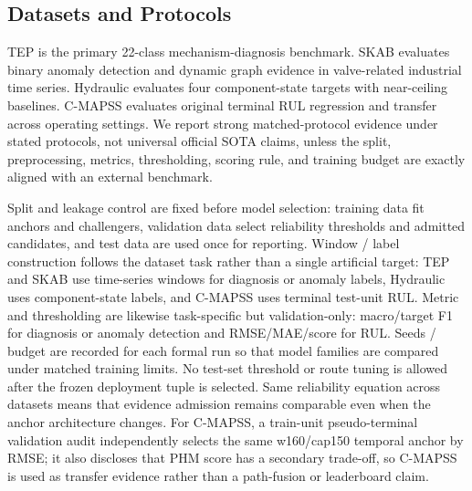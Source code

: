\documentclass[letterpaper]{article}
\begin{document}
\subsection{Datasets and Protocols}

TEP is the primary 22-class mechanism-diagnosis benchmark. SKAB evaluates binary anomaly detection and dynamic graph evidence in valve-related industrial time series. Hydraulic evaluates four component-state targets with near-ceiling baselines. C-MAPSS evaluates original terminal RUL regression and transfer across operating settings. We report strong matched-protocol evidence under stated protocols, not universal official SOTA claims, unless the split, preprocessing, metrics, thresholding, scoring rule, and training budget are exactly aligned with an external benchmark.

Split and leakage control are fixed before model selection: training data fit anchors and challengers, validation data select reliability thresholds and admitted candidates, and test data are used once for reporting. Window / label construction follows the dataset task rather than a single artificial target: TEP and SKAB use time-series windows for diagnosis or anomaly labels, Hydraulic uses component-state labels, and C-MAPSS uses terminal test-unit RUL. Metric and thresholding are likewise task-specific but validation-only: macro/target F1 for diagnosis or anomaly detection and RMSE/MAE/score for RUL. Seeds / budget are recorded for each formal run so that model families are compared under matched training limits. No test-set threshold or route tuning is allowed after the frozen deployment tuple is selected. Same reliability equation across datasets means that evidence admission remains comparable even when the anchor architecture changes. For C-MAPSS, a train-unit pseudo-terminal validation audit independently selects the same w160/cap150 temporal anchor by RMSE; it also discloses that PHM score has a secondary trade-off, so C-MAPSS is used as transfer evidence rather than a path-fusion or leaderboard claim.
\end{document}
